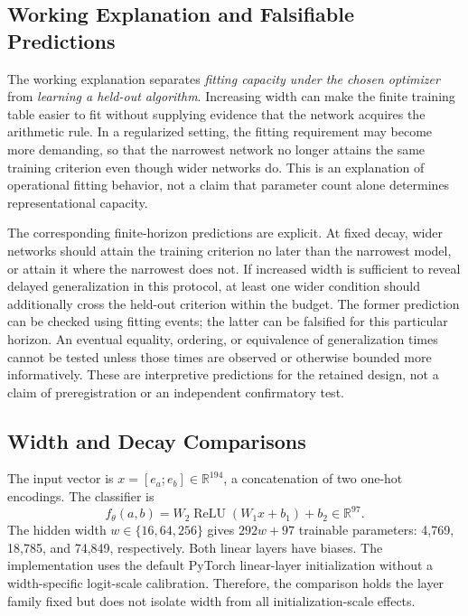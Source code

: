 \documentclass{article}
\begin{document}
\subsection{Working Explanation and Falsifiable Predictions}

The working explanation separates \emph{fitting capacity under the chosen optimizer} from \emph{learning a held-out algorithm}. Increasing width can make the finite training table easier to fit without supplying evidence that the network acquires the arithmetic rule. In a regularized setting, the fitting requirement may become more demanding, so that the narrowest network no longer attains the same training criterion even though wider networks do. This is an explanation of operational fitting behavior, not a claim that parameter count alone determines representational capacity.

The corresponding finite-horizon predictions are explicit. At fixed decay, wider networks should attain the training criterion no later than the narrowest model, or attain it where the narrowest does not. If increased width is sufficient to reveal delayed generalization in this protocol, at least one wider condition should additionally cross the held-out criterion within the budget. The former prediction can be checked using fitting events; the latter can be falsified for this particular horizon. An eventual equality, ordering, or equivalence of generalization times cannot be tested unless those times are observed or otherwise bounded more informatively. These are interpretive predictions for the retained design, not a claim of preregistration or an independent confirmatory test.

\subsection{Width and Decay Comparisons}

The input vector is $x=[e_a;e_b]\in\mathbb{R}^{194}$, a concatenation of two one-hot encodings. The classifier is
\begin{equation}
 f_\theta(a,b)=W_2\operatorname{ReLU}(W_1x+b_1)+b_2\in\mathbb{R}^{97}.
\end{equation}
The hidden width $w\in\{16,64,256\}$ gives $292w+97$ trainable parameters: 4,769, 18,785, and 74,849, respectively. Both linear layers have biases. The implementation uses the default PyTorch linear-layer initialization without a width-specific logit-scale calibration. Therefore, the comparison holds the layer family fixed but does not isolate width from all initialization-scale effects.
\end{document}
